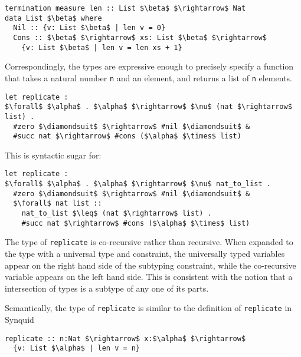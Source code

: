 \documentclass[sigplan,screen]{acmart}
\begin{document}
\begin{lstlisting}[keywords={termination, measure, data, where}]
termination measure len :: List $\beta$ $\rightarrow$ Nat 
data List $\beta$ where
  Nil :: {v: List $\beta$ | len v = 0}
  Cons :: $\beta$ $\rightarrow$ xs: List $\beta$ $\rightarrow$ 
    {v: List $\beta$ | len v = len xs + 1}

\end{lstlisting}

\hfill

\noindent Correspondingly, the types are expressive enough to precisely specify
a function that takes a natural number \lstinline{n} 
and an element, and returns a list of \lstinline{n} elements.

\begin{lstlisting}[]
let replicate : 
$\forall$ $\alpha$ . $\alpha$ $\rightarrow$ $\nu$ (nat $\rightarrow$ list) .
  #zero $\diamondsuit$ $\rightarrow$ #nil $\diamondsuit$ & 
  #succ nat $\rightarrow$ #cons ($\alpha$ $\times$ list)
\end{lstlisting}



\hfill

\noindent This is syntactic sugar for:

\begin{lstlisting}[]
let replicate : 
$\forall$ $\alpha$ . $\alpha$ $\rightarrow$ $\nu$ nat_to_list .
  #zero $\diamondsuit$ $\rightarrow$ #nil $\diamondsuit$ & 
  $\forall$ nat list :: 
    nat_to_list $\leq$ (nat $\rightarrow$ list) .
    #succ nat $\rightarrow$ #cons ($\alpha$ $\times$ list)
\end{lstlisting}

\hfill

\noindent The type of \lstinline{replicate} is co-recursive rather than recursive. 
When expanded to the type with a universal type and constraint, 
the universally typed variables appear on the right hand side 
of the subtyping constraint, while the co-recursive variable
appears on the left hand side. This is consistent with the notion
that a intersection of types is a subtype of any one of its parts.

\hfill

\noindent Semantically, the type of \lstinline{replicate} is similar to the definition of 
\lstinline{replicate} in Synquid \cite{}    

\begin{lstlisting}[keywords={termination, measure, data, where}]
replicate :: n:Nat $\rightarrow$ x:$\alpha$ $\rightarrow$ 
  {v: List $\alpha$ | len v = n}

\end{lstlisting}
\end{document}
